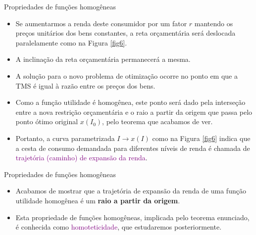 \documentclass[10pt]{beamer}
\begin{document}
\begin{frame}{Propriedades de funções homogêneas}
    \begin{itemize}
        \item Se aumentarmos a renda deste consumidor por um fator $r$ mantendo os preços unitários dos bens constantes, a reta orçamentária será deslocada paralelamente como na Figura \ref{fig6}.
        \bigskip
        \item A inclinação da reta orçamentária permanecerá a mesma.
        \bigskip
        \item A solução para o novo problema de otimização ocorre no ponto em que a TMS é igual à razão entre os preços dos bens.
        \bigskip
        \item Como a função utilidade é homogênea, este ponto será dado pela interseção entre a nova restrição orçamentária e o raio a partir da origem que passa pelo ponto ótimo original $x(I_0)$, pelo teorema que acabamos de ver.
        \bigskip
        \item Portanto, a curva parametrizada $I \rightarrow x(I)$ como na Figura \ref{fig6} indica que a cesta de consumo demandada para diferentes níveis de renda é chamada de \textcolor{purple}{trajetória (caminho) de expansão da renda}.
        
    \end{itemize}
\end{frame}

\begin{frame}{Propriedades de funções homogêneas}
    \begin{itemize}
        \item Acabamos de mostrar que a trajetória de expansão da renda de uma função utilidade homogênea é um \textbf{raio a partir da origem}.
        \bigskip
        \item Esta propriedade de funções homogêneas, implicada pelo teorema enunciado, é conhecida como \textcolor{purple}{homoteticidade}, que estudaremos posteriormente.
    \end{itemize}
\end{frame}
\end{document}
